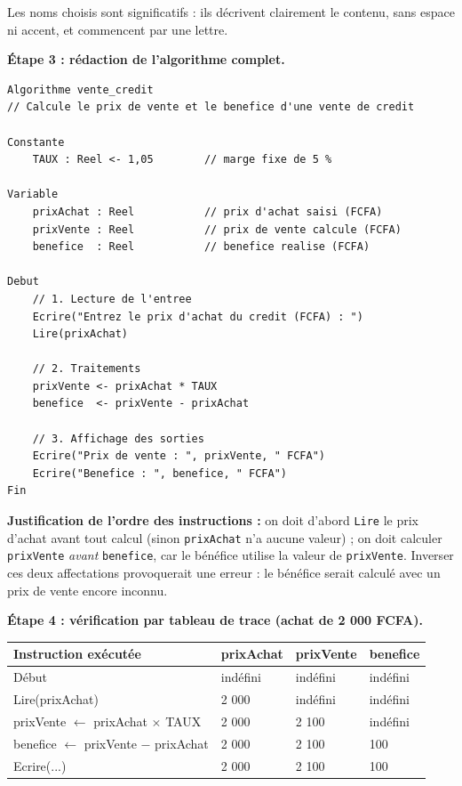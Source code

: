 \documentclass[11pt]{article}
\newcommand{\cle}[1]{{\popxbold\color{popdark}#1}}
\begin{document}
\begin{exoresolu}
Les noms choisis sont \cle{significatifs} : ils décrivent clairement le contenu, sans espace ni accent, et commencent par une lettre.

\textbf{Étape 3 : rédaction de l'algorithme complet.}

\begin{lstlisting}
Algorithme vente_credit
// Calcule le prix de vente et le benefice d'une vente de credit

Constante
    TAUX : Reel <- 1,05        // marge fixe de 5 %

Variable
    prixAchat : Reel           // prix d'achat saisi (FCFA)
    prixVente : Reel           // prix de vente calcule (FCFA)
    benefice  : Reel           // benefice realise (FCFA)

Debut
    // 1. Lecture de l'entree
    Ecrire("Entrez le prix d'achat du credit (FCFA) : ")
    Lire(prixAchat)

    // 2. Traitements
    prixVente <- prixAchat * TAUX
    benefice  <- prixVente - prixAchat

    // 3. Affichage des sorties
    Ecrire("Prix de vente : ", prixVente, " FCFA")
    Ecrire("Benefice : ", benefice, " FCFA")
Fin
\end{lstlisting}

\textbf{Justification de l'ordre des instructions :} on doit d'abord \texttt{Lire} le prix d'achat avant tout calcul (sinon \texttt{prixAchat} n'a aucune valeur) ; on doit calculer \texttt{prixVente} \emph{avant} \texttt{benefice}, car le bénéfice utilise la valeur de \texttt{prixVente}. Inverser ces deux affectations provoquerait une erreur : le bénéfice serait calculé avec un prix de vente encore inconnu.

\textbf{Étape 4 : vérification par tableau de trace (achat de 2 000 FCFA).}

\begin{center}
\begin{tabularx}{\linewidth}{|X|l|l|l|}
\hline
\rowcolor{popblueL} \textbf{Instruction exécutée} & \textbf{prixAchat} & \textbf{prixVente} & \textbf{benefice} \\
\hline
Début & indéfini & indéfini & indéfini \\
\hline
Lire(prixAchat) & 2 000 & indéfini & indéfini \\
\hline
prixVente $\leftarrow$ prixAchat $\times$ TAUX & 2 000 & 2 100 & indéfini \\
\hline
benefice $\leftarrow$ prixVente $-$ prixAchat & 2 000 & 2 100 & 100 \\
\hline
Ecrire(...) & 2 000 & 2 100 & 100 \\
\hline
\end{tabularx}
\end{center}


\end{exoresolu}
\end{document}
